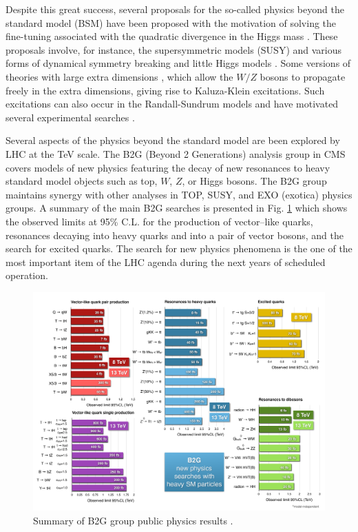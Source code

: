 Despite this great success, several proposals for the so-called physics beyond the standard model (BSM) \cite{Allanach:2006fy} have been proposed with the motivation of solving the fine-tuning associated with the quadratic divergence in the Higgs mass \cite{Bustamante:2009us}. These proposals involve, for instance, the supersymmetric models (SUSY) \cite{Martin:1997ns} and various forms of dynamical symmetry breaking and little Higgs models \cite{Ellis:2009su}. Some versions of theories with large extra dimensions \cite{Csaki:2004ay}, which allow the $W/Z$ bosons to propagate freely in the extra dimensions, giving rise to Kaluza-Klein \cite{Dienes:2002hg} excitations. Such excitations can also occur in the Randall-Sundrum models \cite{Randall:1999ee} and have motivated several experimental searches \cite{Chatrchyan:2012rva,Khachatryan:2014hpa,Khachatryan:2014gha,Khachatryan:2015ywa,Khachatryan:2016cfa,Khachatryan:2016sey}. 

Several aspects of the physics beyond the standard model are been explored by LHC at the TeV scale. The B2G (Beyond 2 Generations) analysis group in CMS covers models of new physics featuring the decay of new resonances to heavy standard model objects such as top, $W$,  $Z$, or Higgs bosons. The B2G group maintains synergy with other analyses in TOP, SUSY, and EXO (exotica) physics groups. A summary of the main B2G searches is presented in Fig. \ref{B2Gsummary} which shows the observed limits at 95\% C.L. for the production of vector--like quarks, resonances decaying into heavy quarks and into a pair of vector bosons, and the search for excited quarks. The search for new physics phenomena is the one of the most important item of the LHC agenda during the next years of scheduled operation.

\begin{figure}[htb!!]
\centering
\includegraphics[scale=0.58, angle=90]{figures/theory/B2GSummary.pdf}
\caption[B2G Summary]{Summary of B2G group public physics results \cite{CMS:B2Gsummary}.}
\label{B2Gsummary}
\end{figure}

